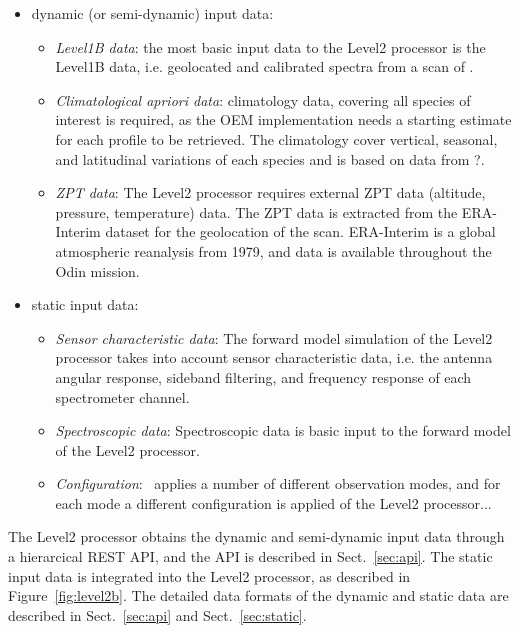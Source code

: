 \begin{itemize}
  \item dynamic (or semi-dynamic) input data:
  \begin{itemize}

    \item \emph{Level1B data}: the most basic input data to the 
    Level2 processor is the Level1B data, i.e. geolocated and 
    calibrated spectra from a scan of \smr.
    
    \item \emph{Climatological \textit{apriori} data}:
    climatology data, covering all species of interest is required, as
    the OEM implementation needs a starting estimate for each profile
    to be retrieved. The climatology cover vertical, seasonal,
    and latitudinal variations of each species and is based on data
    from ?.

    \item \emph{ZPT data}:
    The Level2 processor requires external ZPT data (altitude, pressure, temperature)
    data. The ZPT data is extracted from the ERA-Interim dataset for the geolocation
    of the scan. ERA-Interim is a global atmospheric reanalysis from 1979, and
    data is available throughout the Odin mission.
  \end{itemize}
  \item static input data:
  \begin{itemize}
    \item \emph{Sensor characteristic data}:
    The forward model simulation of the Level2 processor takes into account
    sensor characteristic data, i.e. the antenna angular response,
    sideband filtering, and frequency response of each spectrometer channel.

    \item \emph{Spectroscopic data}:
    Spectroscopic data is basic input to the forward model of the Level2
    processor.

    \item \emph{Configuration}:
    \smr\ applies a number of different observation modes,
    and for each mode a different configuration is applied
    of the Level2 processor...
  \end{itemize}
\end{itemize}


The Level2 processor obtains the dynamic 
and semi-dynamic input data through a hierarcical
REST API, and the API is described in Sect.~\ref{sec:api}.
The static input data is integrated into the
Level2 processor, as described in Figure~\ref{fig:level2b}. 
The detailed data formats of the dynamic 
and static data are described in 
Sect.~\ref{sec:api} and Sect.~\ref{sec:static}.


